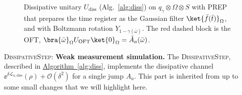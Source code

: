 \begin{figure}[ht]
  \centering
  \caption{Dissipative unitary $U_{\mathrm{diss}}$ (Alg.~\ref*{alg:diss}) on
  $q_\gamma\otimes\Omega\otimes S$ with PREP that prepares the time register as the Gaussian filter $\ket{\bar{f}(\bar{t})}_\Omega$, and with Boltzmann rotation
  $Y_{1-\gamma(\bar{\omega})}$.
  The red dashed block is the OFT,
  $\bra{\bar\omega}_\Omega U_{\mathrm{OFT}}\ket{0}_\Omega = \tilde A_a(\bar\omega)$.}
  \label{circ:u-diss}
\end{figure}

\medskip
\noindent\textsc{DissipativeStep:} \textbf{Weak measurement simulation.}
The \textsc{DissipativeStep}, described in \hyperref[alg:diss]{Algorithm~\ref*{alg:diss}}, implements the dissipative channel $\ee^{\delta\mathcal{L}_{a,\mathrm{diss}}}(\rho) + \mathcal{O}(\delta^2)$ for a single jump $A_a$. This part is inherited from \cite[Theorem III.1]{chen2023quantum} up to some small changes that we will highlight here. 

